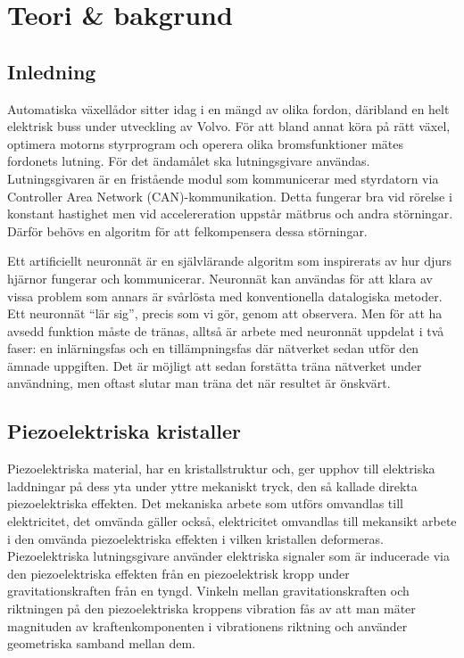 \section{Teori \& bakgrund}
\subsection{Inledning}
Automatiska växellådor sitter idag i en mängd av olika fordon,
däribland en helt elektrisk buss under utveckling av Volvo.
För att bland annat köra på rätt växel, optimera motorns styrprogram
och operera olika bromsfunktioner %
mätes fordonets lutning.
För det ändamålet ska lutningsgivare användas.
Lutningsgivaren är en fristående modul som kommunicerar med styrdatorn via
Controller Area Network (CAN)-kommunikation.
Detta fungerar bra vid rörelse i konstant hastighet
men vid accelereration uppstår mätbrus och andra störningar.
Därför behövs en algoritm för att felkompensera dessa störningar.

Ett artificiellt neuronnät är en självlärande algoritm som inspirerats av
hur djurs hjärnor fungerar och kommunicerar.
Neuronnät kan användas för att klara av vissa problem som annars är svårlösta
med konventionella datalogiska metoder.
Ett neuronnät ``lär sig'', precis som vi gör, genom att observera.
Men för att ha avsedd funktion måste de tränas, alltså är arbete med neuronnät
uppdelat i två faser: en inlärningsfas och en tillämpningsfas där nätverket sedan
utför den ämnade uppgiften.
\autocite{copeland16}
Det är möjligt att sedan forstätta träna nätverket
under användning, men oftast slutar man träna det när resultet är önskvärt.
\autocite{wiki-neuronnat}


\subsection{Piezoelektriska kristaller}
Piezoelektriska material, har en kristallstruktur och, ger upphov till
elektriska laddningar på dess yta under yttre mekaniskt tryck, den så kallade
direkta piezoelektriska effekten.
Det mekaniska arbete som utförs omvandlas till elektricitet, det omvända gäller
också, elektricitet omvandlas till mekansikt arbete i den omvända
piezoelektriska effekten i vilken kristallen deformeras.
\autocite{electronicdesign2016}
Piezoelektriska lutningsgivare använder elektriska signaler som är
inducerade via den piezoelektriska effekten från en piezoelektrisk kropp
under gravitationskraften från en tyngd.
Vinkeln mellan gravitationskraften och
riktningen på den piezoelektriska kroppens vibration
fås av att man mäter magnituden av kraftenkomponenten i vibrationens riktning
och använder geometriska samband mellan dem.
\autocite{chiang00}


